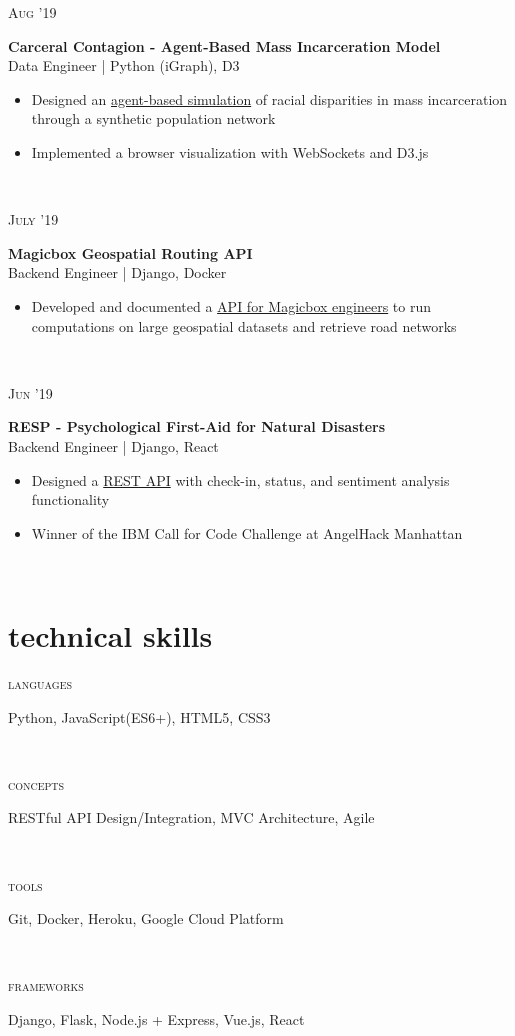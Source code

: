 \documentclass[letterpaper, 11pt]{article}
\newcommand{\projectentry}[4]{
    \begin{minipage}[t]{.15\linewidth}
    \hfill \textsc{#1}
    \end{minipage}
    \hfill\vline\hfill
    \begin{minipage}[t]{.80\linewidth}
    {\bf#2}
    \\ #3 
    \vspace{-1.5mm}
    \small{#4}
    \end{minipage}\\
    \vspace{.15cm}
    }
\newcommand{\skillentry}[2]{
    \begin{minipage}[t]{.15\linewidth}
        \hfill \textsc{#1}
        \end{minipage}
        \hfill\vline\hfill
        \begin{minipage}[t]{.80\linewidth}
        #2
        \end{minipage}\\
    }
\begin{document}
        \projectentry{Aug '19}
        {Carceral Contagion - Agent-Based Mass Incarceration Model}
        {Data Engineer | Python (iGraph), D3}
        {\begin{itemize}
            \setlength\itemsep{0.1mm}
            \item Designed an \href{https://github.com/msradam/carceral-contagion}{agent-based simulation} of racial disparities in mass incarceration through a synthetic population network 
            \item Implemented a browser visualization with WebSockets and D3.js
          \end{itemize}
        }

        \projectentry{July '19}
            {Magicbox Geospatial Routing API}
            {Backend Engineer | Django, Docker}
            {\begin{itemize}
                \setlength\itemsep{0.1mm}
                \item Developed and documented a \href{https://github.com/msradam/magicbox-routing-api}{API for Magicbox engineers} to run computations on large geospatial datasets and retrieve road networks
            \end{itemize}
            }

        \projectentry{Jun '19}
            {RESP - Psychological First-Aid for Natural Disasters}
            {Backend Engineer | Django, React}
            {\begin{itemize}
                \setlength\itemsep{0.1mm}
                \item Designed a \href{https://github.com/msradam/resp-api}{REST API} with check-in, status, and sentiment analysis functionality
                \item Winner of the IBM Call for Code Challenge at AngelHack Manhattan
            \end{itemize}
            }
            
    \section{technical skills}

    \skillentry{languages}{Python, JavaScript(ES6+), HTML5, CSS3 }
    \skillentry{concepts}{RESTful API Design/Integration, MVC Architecture, Agile}
    \skillentry{tools}{Git, Docker, Heroku, Google Cloud Platform }
    \skillentry{frameworks}{Django, Flask, Node.js + Express, Vue.js, React}
\end{document}
